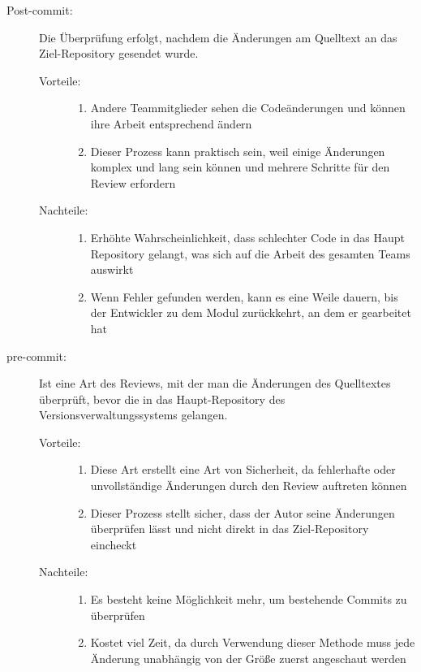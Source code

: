 \begin{description}
	\item [Post-commit:]
		Die Überprüfung erfolgt, nachdem die Änderungen am Quelltext an das Ziel-Repository gesendet wurde.
		\begin{description}
			\item [Vorteile:] \hfill
			\begin{enumerate}
				\item Andere Teammitglieder sehen die Codeänderungen und können ihre Arbeit entsprechend ändern
				\item Dieser Prozess kann praktisch sein, weil einige Änderungen komplex und lang sein können und mehrere Schritte für den Review erfordern
			\end{enumerate}
			
			\item[Nachteile:] \hfill
			\begin{enumerate}
				\item Erhöhte Wahrscheinlichkeit, dass schlechter Code in das Haupt Repository gelangt, was sich auf die Arbeit des gesamten Teams auswirkt
				\item Wenn Fehler gefunden werden, kann es eine Weile dauern, bis der Entwickler zu dem Modul zurückkehrt, an dem er gearbeitet hat
			\end{enumerate}
		\end{description}
		
		
	\item [pre-commit:]
		Ist eine Art des Reviews, mit der man die Änderungen des Quelltextes überprüft, bevor die in das Haupt-Repository des Versionsverwaltungssystems gelangen.
		\begin{description}
		
			\item [Vorteile:] \hfill
			\begin{enumerate}
				\item Diese Art erstellt eine Art von Sicherheit, da fehlerhafte oder unvollständige Änderungen durch den Review auftreten können
				\item Dieser Prozess stellt sicher, dass der Autor seine Änderungen überprüfen lässt und nicht direkt in das Ziel-Repository eincheckt
			\end{enumerate}
		
			\item [Nachteile:] \hfill
			\begin{enumerate}
				\item Es besteht keine Möglichkeit mehr, um bestehende Commits zu überprüfen
				\item Kostet viel Zeit, da durch Verwendung dieser Methode muss jede Änderung unabhängig von der Größe zuerst angeschaut werden
			\end{enumerate}
			

\end{description}
\end{description}
